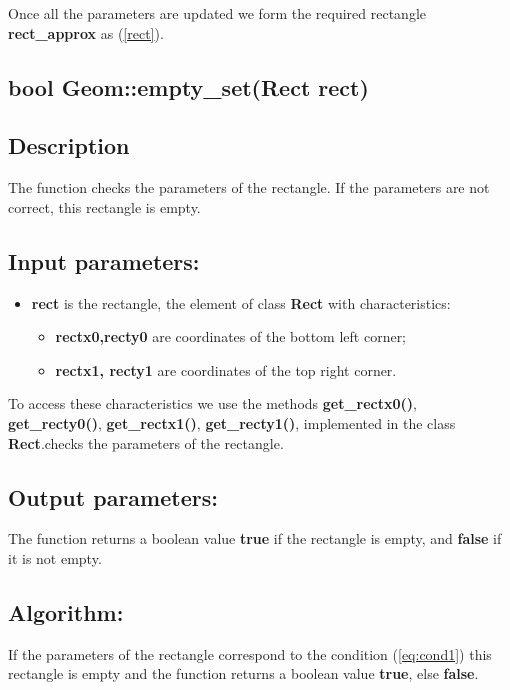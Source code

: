 \documentclass{report}
\begin{document}
Once all the parameters are updated we form the required rectangle {\bfseries rect\_approx} as (\ref{rect}).

\newpage
\begin{center} 
	\section*{\bfseries bool Geom::empty\_set(Rect rect)}
\end{center} 

\subsection*{Description}

The function checks the parameters of the rectangle. If the parameters are not correct, this rectangle is empty. 

\subsection*{Input parameters:}

\begin{itemize}
	\item {\bfseries	rect} is the rectangle, the element of class {\bfseries Rect} with characteristics:
	
	\begin{itemize}
		\item {\bfseries rectx0,recty0} are coordinates of the bottom left corner;
		\item {\bfseries rectx1, recty1} are coordinates of the top right corner.
	\end{itemize}
\end{itemize}

To access these characteristics we use the methods  {\bfseries get\_rectx0()}, {\bfseries get\_recty0()}, {\bfseries get\_rectx1()}, {\bfseries get\_recty1()}, implemented in the class {\bfseries Rect}.checks the parameters  of the rectangle.

\subsection*{Output parameters:}

The function returns a boolean value {\bfseries true} if the rectangle is empty, and {\bfseries false} if it is not empty.

\subsection*{Algorithm:}

If the parameters of the rectangle correspond to the condition (\ref{eq:cond1}) this rectangle is empty and the function returns a boolean value {\bfseries true}, else  {\bfseries false}. 
\end{document}
